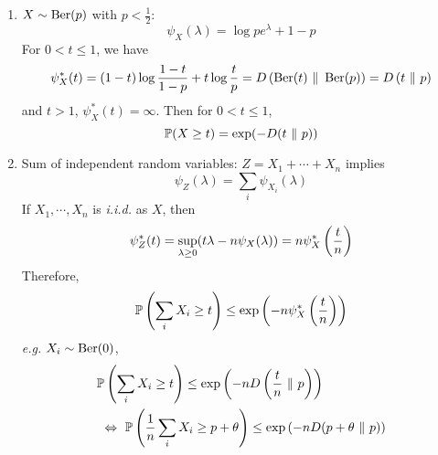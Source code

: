 \begin{enumerate}[label=\arabic{*}.]
\begin{exam}
\begin{enumerate}[label=(\arabic{*})]
	    	\item $X \sim \operatorname{Ber}(p)$ with $p < \frac{1}{2}$: 
	    	\begin{equation*}
	    		\psi_X(\lambda) = \log pe^\lambda + 1 - p
	    	\end{equation*}
	    	For $0 < t \leq 1$, we have
	    	\begin{equation*}
	    		\psi_X^*(t) = (1-t)\log\frac{1-t}{1-p} + t\log \frac{t}{p} = D\left(\operatorname{Ber}(t)~ \Vert~ \operatorname{Ber}(p)\right) = D\left(t~ \Vert~ p\right)
	    	\end{equation*}
	    	and $t > 1$, $\psi_X^*(t) = \infty$. Then for $0 < t \leq 1$,
	    	\begin{equation*}
	    		\mathbb{P}(X \geq t) = \exp(-D(t~ \Vert~ p))
	    	\end{equation*}


	    	\item Sum of independent random variables: $Z = X_1 +\cdots +X_n$ implies
	    	\begin{equation*}
	    		\psi_Z(\lambda) = \sum_i \psi_{X_i}(\lambda)
	    	\end{equation*}
	    	If $X_1,\cdots, X_n$ is \emph{i.i.d.} as $X$, then
	    	\begin{equation*}
	    		\psi_Z^*(t) = \sup_{\lambda \geq 0}(t \lambda - n\psi_X(\lambda)) = n\psi^*_X\left(\frac{t}{n}\right)
	    	\end{equation*}
	    	Therefore,
	    	\begin{equation*}
	    		\mathbb{P}\left(\sum_i X_i \geq t\right) \leq \exp\left(-n\psi^*_X\left(\frac{t}{n}\right)\right)
	    	\end{equation*}
	    	\emph{e.g.} $X_i \sim \operatorname{Ber}(0)$,
	    	\begin{equation*}
	    		\begin{aligned}
	    			&\mathbb{P}\left(\sum_i X_i \geq t\right) \leq \exp\left(-nD\left(\frac{t}{n}~ \Vert~ p\right)\right) \\
	    			&~\Leftrightarrow~ \mathbb{P}\left(\frac{1}{n}\sum_i X_i \geq p+\theta\right) \leq \exp\left(-nD(p+\theta~ \Vert~ p)\right)
	    		\end{aligned}
	    	\end{equation*}



\end{enumerate}
\end{exam}
\end{enumerate}
